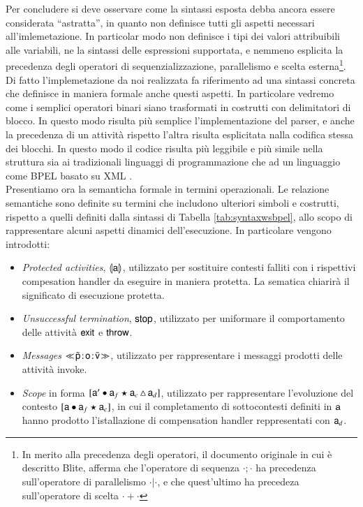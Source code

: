 Per concludere si deve osservare come la sintassi esposta debba ancora essere 
considerata ``astratta'', in quanto non definisce tutti gli aspetti necessari
all'imlemetazione. In particolar modo non definisce i tipi dei valori
attribuibili alle variabili, ne la sintassi delle espressioni supportata, e
nemmeno esplicita la precedenza degli operatori di sequenzializzazione,
parallelismo e scelta esterna\footnote{In merito alla precedenza degli
operatori, il documento originale in cui è descritto Blite, afferma che
l'operatore di sequenza $\cdot ; \cdot$ ha precedenza
sull'operatore di parallelismo $\cdot | \cdot$, e che quest'ultimo ha precedeza
sull'operatore di scelta $\cdot + \cdot$}. Di fatto l'implemetazione da noi
realizzata fa riferimento ad una sintassi concreta che definisce in maniera
formale anche questi aspetti. In particolare vedremo come  i semplici
operatori binari siano trasformati in costrutti con 
delimitatori di blocco. In questo modo risulta più semplice
l'implementazione del parser, 
e anche la
precedenza di un attività rispetto l'altra risulta esplicitata nalla codifica stessa dei blocchi. In questo modo il codice risulta
più leggibile e più simile nella struttura sia ai tradizionali linguaggi di
programmazione che ad un linguaggio come BPEL basato su XML .
\\

Presentiamo ora la semanticha formale in termini operazionali. Le relazione
semantiche sono definite su termini che includono ulteriori
simboli e costrutti, rispetto a quelli definiti dalla sintassi di Tabella
\ref{tab:syntaxwsbpel}, allo scopo di rappresentare alcuni aspetti dinamici
dell'esecuzione. In particolare vengono introdotti:

\begin{itemize}
  \item \emph{Protected activities}, $\llparenthesis {\sf a}\rrparenthesis$, utilizzato per sostituire
  contesti falliti con i rispettivi compesation handler da eseguire in maniera
  protetta. La sematica chiarirà il significato di esecuzione protetta.
  
  \item \emph{Unsuccessful termination}, ${\sf stop}$, utilizzato per uniformare il
  comportamento delle attività ${\sf exit}$ e ${\sf throw}$.
  
  \item \emph{Messages} $\ll\!\tilde{{\sf p}}\! : \! {\sf o}\! : \! \bar{{\sf v}}\!\gg$, utilizzato per
  rappresentare i messaggi prodotti delle attività invoke.
    
  \item \emph{Scope} in forma $[{\sf a}' \bullet {\sf a}_f \star {\sf a}_c\, \triangle\, {\sf a}_d]$,
  utilizzato per rappresentare l'evoluzione del contesto
  $[{\sf a} \bullet {\sf a}_f \star {\sf a}_c]$, in cui il completamento di sottocontesti
  definiti in ${\sf a}$ hanno prodotto l'istallazione di compensation handler
  reppresentati con ${\sf a}_d$.
\end{itemize}


